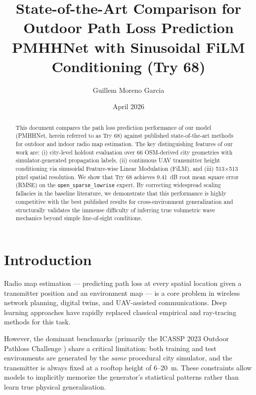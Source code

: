 \documentclass[11pt,a4paper]{article}
\title{%
    \textbf{State-of-the-Art Comparison for Outdoor Path Loss Prediction}\\[0.5em]
    \large PMHHNet with Sinusoidal FiLM Conditioning (Try 68)\\[0.3em]
}
\author{Guillem Moreno Garcia}
\date{April 2026}
\begin{document}
\maketitle
\thispagestyle{fancy}

\begin{abstract}
This document compares the path loss prediction performance of our model (PMHHNet,
herein referred to as Try 68) against published state-of-the-art methods for
outdoor and indoor radio map estimation. The key distinguishing features of our
work are: (i) city-level holdout evaluation over 66 OSM-derived city geometries
with simulator-generated propagation labels,
(ii) continuous UAV transmitter height conditioning via sinusoidal Feature-wise
Linear Modulation (FiLM), and (iii) 513$\times$513 pixel spatial resolution.
We show that Try 68 achieves 9.41~dB root mean square error (RMSE) on the
\texttt{open\_sparse\_lowrise} expert. By correcting widespread scaling fallacies in the baseline literature, we demonstrate that this performance is highly competitive with the best published results for cross-environment generalization and structurally validates the immense difficulty of inferring true volumetric wave mechanics beyond simple line-of-sight conditions.
\end{abstract}

\tableofcontents
\newpage

\section{Introduction}
\label{sec:intro}

Radio map estimation — predicting path loss at every spatial location given a
transmitter position and an environment map — is a core problem in wireless
network planning, digital twins, and UAV-assisted communications. Deep learning
approaches have rapidly replaced classical empirical and ray-tracing methods for
this task.

However, the dominant benchmarks (primarily the ICASSP 2023 Outdoor Pathloss
Challenge \cite{icassp2023challenge}) share a critical limitation: both training
and test environments are generated by the \emph{same} procedural city simulator,
and the transmitter is always fixed at a rooftop height of 6--20~m. These
constraints allow models to implicitly memorize the generator's statistical patterns
rather than learn true physical generalisation. 
\end{document}
